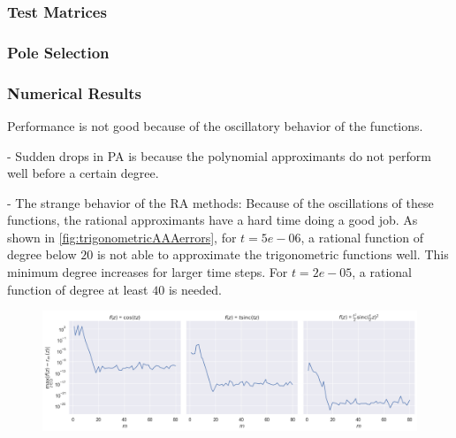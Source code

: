 
\subsubsection*{Test Matrices}

\subsubsection*{Pole Selection}

\subsubsection*{Numerical Results}

Performance is not good because of the oscillatory behavior of the functions.


- Sudden drops in PA is because the polynomial approximants do not perform well
before a certain degree.

- The strange behavior of the RA methods:
Because of the oscillations of these functions, the rational approximants have a
hard time doing a good job.
As shown in \autoref{fig:trigonometricAAAerrors}, for $t = 5e-06$, a rational function of degree below $20$
is not able to approximate the trigonometric functions well. This minimum degree increases for larger
time steps. For $t = 2e-05$, a rational function of degree at least $40$ is needed.


\begin{figure}[h]
    \centering
    \includegraphics[width=.9\textwidth]{img/trigonometric/AAA_errors_t5e-06.png}
    \caption{
        }
        \label{fig:trigonometricAAAerrors}
\end{figure}


